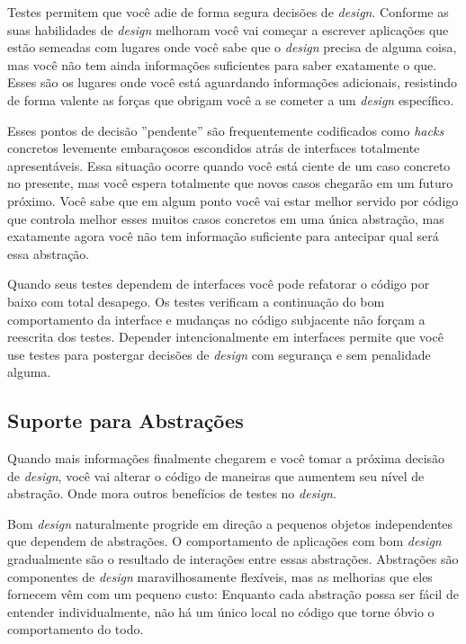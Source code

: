 Testes permitem que você adie de forma segura decisões de \textit{design}. Conforme as suas habilidades de \textit{design} melhoram você vai começar a escrever aplicações que estão semeadas com lugares onde você sabe que o \textit{design} precisa de alguma coisa, mas você não tem ainda informações suficientes para saber exatamente o que. Esses são os lugares onde você está aguardando informações adicionais, resistindo de forma valente as forças que obrigam você a se cometer a um \textit{design} específico.

Esses pontos de decisão ''pendente'' são frequentemente codificados como \textit{hacks} concretos levemente embaraçosos escondidos atrás de interfaces totalmente apresentáveis. Essa situação ocorre quando você está ciente de um caso concreto no presente, mas você espera totalmente que novos casos chegarão em um futuro próximo. Você sabe que em algum ponto você vai estar melhor servido por código que controla melhor esses muitos casos concretos em uma única abstração, mas exatamente agora você não tem informação suficiente para antecipar qual será essa abstração.

Quando seus testes dependem de interfaces você pode refatorar o código por baixo com total desapego. Os testes verificam a continuação do bom comportamento da interface e mudanças no código subjacente não forçam a reescrita dos testes. Depender intencionalmente em interfaces permite que você use testes para postergar decisões de \textit{design} com segurança e sem penalidade alguma.

\subsection{Suporte para Abstrações}

Quando mais informações finalmente chegarem e você tomar a próxima decisão de \textit{design}, você vai alterar o código de maneiras que aumentem seu nível de abstração. Onde mora outros benefícios de testes no \textit{design}.

Bom \textit{design} naturalmente progride em direção a pequenos objetos independentes que dependem de abstrações. O comportamento de aplicações com bom \textit{design} gradualmente são o resultado de interações entre essas abstrações. Abstrações são componentes de \textit{design} maravilhosamente flexíveis, mas as melhorias que eles fornecem vêm com um pequeno custo: Enquanto cada abstração possa ser fácil de entender individualmente, não há um único local no código que torne óbvio o comportamento do todo.

